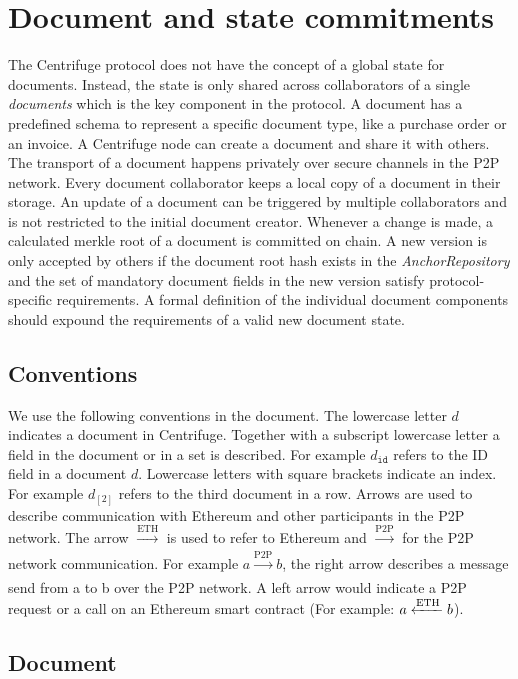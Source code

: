 \section{Document and state commitments}\label{sec:doc_state_comm}
The Centrifuge protocol does not have the concept of a global state for documents. Instead, the state is only shared across collaborators of a single \textit{documents} which is the key component in the protocol.
A document has a predefined schema to represent a specific document type, like a purchase order or an invoice. A Centrifuge node can create a document and share it with others. The transport of a document happens privately over secure channels in the P2P network. Every document collaborator keeps a local copy of a document in their storage. An update of a document can be triggered by multiple collaborators and is not restricted to the initial document creator. Whenever a change is made, a
calculated merkle root of a document is committed on chain. A new version is only accepted by others if the document root hash exists in the \textit{AnchorRepository} and the set of mandatory document fields in the new version satisfy protocol-specific requirements.  A formal definition of the individual document components should expound the requirements of a valid new document state. 
\subsection{Conventions}
We use the following conventions in the document. The lowercase letter $d$ indicates a document in Centrifuge. Together with a subscript lowercase letter a field in the document or in a set is described. For example $d_{\texttt{id}}$ refers to  the \textsc{ID} field in a document $d$.  Lowercase letters with square brackets indicate an index. For example $d_{[2]}$ refers to the third document in a row. Arrows are used to describe communication with Ethereum and other participants in the P2P network. The arrow $\xrightarrow[]{\text{ETH}}$ is used to refer to Ethereum and $\xrightarrow[]{\text{P2P}}$ for the P2P network communication. For example $a \xrightarrow[]{\text{P2P}} b$, the right arrow describes a message send from a to b over the P2P network. A left arrow would indicate a P2P request or a call on an Ethereum smart contract (For example:  $a \xleftarrow[]{\text{ETH}} b$).
\subsection{Document}
